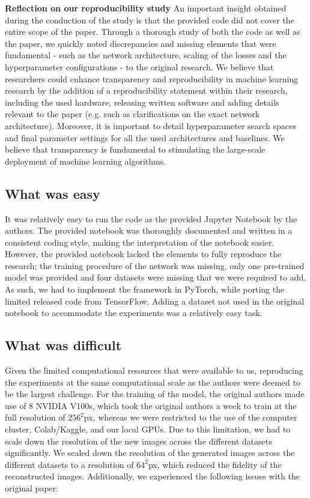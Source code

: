 \textbf{Reflection on our reproducibility study}
An important insight obtained during the conduction of the study is that the provided code did not cover the entire scope of the paper. Through a thorough study of both the code as well as the paper, we quickly noted discrepancies and missing elements that were fundamental - such as the network architecture, scaling of the losses and the hyperparameter configurations - to the original research. 
We believe that researchers could enhance transparency and reproducibility in machine learning research by the addition of a reproducibility statement within their research, including the used hardware, releasing written software and adding details relevant to the paper (e.g. such as clarifications on the exact network architecture). Moreover, it is important to detail hyperparameter search spaces and final parameter settings for all the used architectures and baselines. We believe that transparency is fundamental to stimulating the large-scale deployment of machine learning algorithms.

\subsection{What was easy}
It was relatively easy to run the code as the provided Jupyter Notebook by the authors. The provided notebook was thoroughly documented and written in a consistent coding style, making the interpretation of the notebook easier. However, the provided notebook lacked the elements to fully reproduce the research; the training procedure of the network was missing, only one pre-trained model was provided and four datasets were missing that we were required to add. As such, we had to implement the framework in PyTorch, while porting the limited released code from TensorFlow. Adding a dataset not used in the original notebook to accommodate the experiments was a relatively easy task.

\subsection{What was difficult}

Given the limited computational resources that were available to us, reproducing the experiments at the same computational scale as the authors were deemed to be the largest challenge. For the training of the model, the original authors made use of 8 NVIDIA V100s, which took the original authors a week to train at the full resolution of $256^2$px, whereas we were restricted to the use of the computer cluster, Colab/Kaggle, and our local GPUs. Due to this limitation, we had to scale down the resolution of the new images across the different datasets significantly. We scaled down the resolution of the generated images across the different datasets to a resolution of $64^2$px, which reduced the fidelity of the reconstructed images.  Additionally, we experienced the following issues with the original paper:

